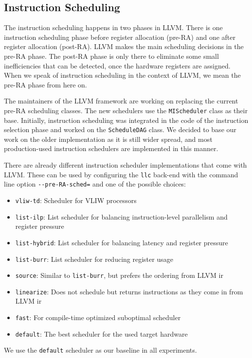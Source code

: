 \subsection{Instruction Scheduling}
The instruction scheduling happens in two phases in LLVM.
There is one instruction scheduling phase before register allocation (pre-RA) and one after register allocation (post-RA).
LLVM makes the main scheduling decisions in the pre-RA phase.
The post-RA phase is only there to eliminate some small inefficiencies that can be detected, once the hardware registers are assigned.
When we speak of instruction scheduling in the context of LLVM, we mean the pre-RA phase from here on.

The maintainers of the LLVM framework are working on replacing the current pre-RA scheduling classes.
The new schedulers use the \lstinline|MIScheduler| class as their base.
Initially, instruction scheduling was integrated in the code of the instruction selection phase and worked on the \lstinline|ScheduleDAG| class.
We decided to base our work on the older implementation as it is still wider spread, and most production-used instruction schedulers are implemented in this manner.

There are already different instruction scheduler implementations that come with LLVM.
These can be used by configuring the \lstinline|llc| back-end with the command line option \lstinline|--pre-RA-sched=| and one of the possible choices:
\begin{itemize}
    \item \lstinline|vliw-td|: Scheduler for VLIW processors
    \item \lstinline|list-ilp|: List scheduler for balancing instruction-level parallelism and register pressure
    \item \lstinline|list-hybrid|: List scheduler for balancing latency and register pressure
    \item \lstinline|list-burr|: List scheduler for reducing register usage
    \item \lstinline|source|: Similar to \lstinline|list-burr|, but prefers the ordering from LLVM \ac{ir}
    \item \lstinline|linearize|: Does not schedule but returns instructions as they come in from LLVM \ac{ir}
    \item \lstinline|fast|: For compile-time optimized suboptimal scheduler
    \item \lstinline|default|: The best scheduler for the used target hardware
\end{itemize}
We use the \lstinline|default| scheduler as our baseline in all experiments.

